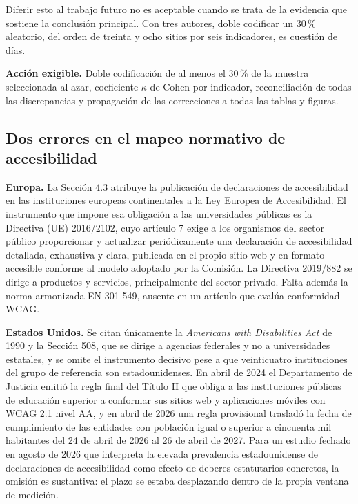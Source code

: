 \documentclass[11pt,a4paper]{article}
\begin{document}
Diferir esto al trabajo futuro no es aceptable cuando se trata de la evidencia que sostiene la conclusi\'on principal. Con tres autores, doble codificar un 30\,\% aleatorio, del orden de treinta y ocho sitios por seis indicadores, es cuesti\'on de d\'ias.

\textbf{Acci\'on exigible.} Doble codificaci\'on de al menos el 30\,\% de la muestra seleccionada al azar, coeficiente $\kappa$ de Cohen por indicador, reconciliaci\'on de todas las discrepancias y propagaci\'on de las correcciones a todas las tablas y figuras.

\subsection{Dos errores en el mapeo normativo de accesibilidad}

\textbf{Europa.} La Secci\'on 4.3 atribuye la publicaci\'on de declaraciones de accesibilidad en las instituciones europeas continentales a la Ley Europea de Accesibilidad. El instrumento que impone esa obligaci\'on a las universidades p\'ublicas es la Directiva (UE) 2016/2102, cuyo art\'iculo 7 exige a los organismos del sector p\'ublico proporcionar y actualizar peri\'odicamente una declaraci\'on de accesibilidad detallada, exhaustiva y clara, publicada en el propio sitio web y en formato accesible conforme al modelo adoptado por la Comisi\'on. La Directiva 2019/882 se dirige a productos y servicios, principalmente del sector privado. Falta adem\'as la norma armonizada EN 301 549, ausente en un art\'iculo que eval\'ua conformidad WCAG.

\textbf{Estados Unidos.} Se citan \'unicamente la \emph{Americans with Disabilities Act} de 1990 y la Secci\'on 508, que se dirige a agencias federales y no a universidades estatales, y se omite el instrumento decisivo pese a que veinticuatro instituciones del grupo de referencia son estadounidenses. En abril de 2024 el Departamento de Justicia emiti\'o la regla final del T\'itulo II que obliga a las instituciones p\'ublicas de educaci\'on superior a conformar sus sitios web y aplicaciones m\'oviles con WCAG 2.1 nivel AA, y en abril de 2026 una regla provisional traslad\'o la fecha de cumplimiento de las entidades con poblaci\'on igual o superior a cincuenta mil habitantes del 24 de abril de 2026 al 26 de abril de 2027. Para un estudio fechado en agosto de 2026 que interpreta la elevada prevalencia estadounidense de declaraciones de accesibilidad como efecto de deberes estatutarios concretos, la omisi\'on es sustantiva: el plazo se estaba desplazando dentro de la propia ventana de medici\'on.
\end{document}
